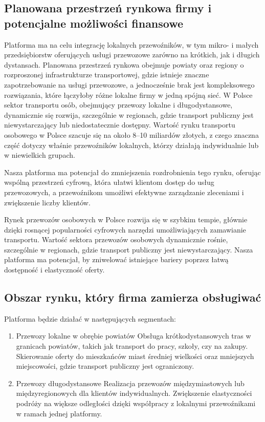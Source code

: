 \subsection{Planowana przestrzeń rynkowa firmy i potencjalne możliwości finansowe}
Platforma ma na celu integrację lokalnych przewoźników, w tym mikro- i małych przedsiębiorstw oferujących usługi przewozowe zarówno na krótkich, jak i długich dystansach. Planowana przestrzeń rynkowa obejmuje powiaty oraz regiony o rozproszonej infrastrukturze transportowej, gdzie istnieje znaczne zapotrzebowanie na usługi przewozowe, a jednocześnie brak jest kompleksowego rozwiązania, które łączyłoby różne lokalne firmy w jedną spójną sieć.
W Polsce sektor transportu osób, obejmujący przewozy lokalne i długodystansowe, dynamicznie się rozwija, szczególnie w regionach, gdzie transport publiczny jest niewystarczający lub niedostatecznie dostępny. Wartość rynku transportu osobowego w Polsce szacuje się na około 8–10 miliardów złotych, z czego znaczna część dotyczy właśnie przewoźników lokalnych, którzy działają indywidualnie lub w niewielkich grupach.

Nasza platforma ma potencjał do zmniejszenia rozdrobnienia tego rynku, oferując wspólną przestrzeń cyfrową, która ułatwi klientom dostęp do usług przewozowych, a przewoźnikom umożliwi efektywne zarządzanie zleceniami i zwiększenie liczby klientów.

Rynek przewozów osobowych w Polsce rozwija się w szybkim tempie, głównie dzięki rosnącej popularności cyfrowych narzędzi umożliwiających zamawianie transportu. Wartość sektora przewozów osobowych dynamicznie rośnie, szczególnie w regionach, gdzie transport publiczny jest niewystarczający. Nasza platforma ma potencjał, by zniwelować istniejące bariery poprzez łatwą dostępność i elastyczność oferty.

\subsection{Obszar rynku, który firma zamierza obsługiwać}
Platforma będzie działać w następujących segmentach:
\begin{enumerate}
     
    \item Przewozy lokalne w obrębie powiatów
        Obsługa krótkodystansowych tras w granicach powiatów, takich jak transport do pracy, szkoły, czy na zakupy.
        Skierowanie oferty do mieszkańców miast średniej wielkości oraz mniejszych miejscowości, gdzie transport publiczny jest ograniczony.

    \item Przewozy długodystansowe
        Realizacja przewozów międzymiastowych lub międzyregionowych dla klientów indywidualnych.
        Zwiększenie elastyczności podróży na większe odległości dzięki współpracy z lokalnymi przewoźnikami w ramach jednej platformy.
 
\end{enumerate}      

